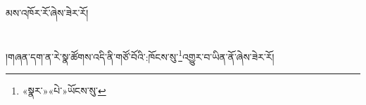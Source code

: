 མས་འཁོར་རོ་ཞེས་ཟེར་རོ།\chapter{ }།གཞན་དག་ན་རེ་སྣ་ཚོགས་འདི་ནི་གཙོ་བོའི་:ཁོངས་སུ་\footnote{«སྣར་»«པེ་»ཡོངས་སུ་}འགྱུར་བ་ཡིན་ནོ་ཞེས་ཟེར་རོ།\